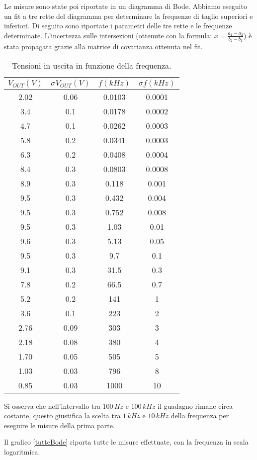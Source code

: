 \documentclass[10pt,a4paper]{article}
\begin{document}
Le misure sono state poi riportate in un diagramma di Bode. Abbiamo eseguito un fit a tre rette del diagramma per determinare la frequenze di taglio superiori e inferiori. Di seguito sono riportate i parametri delle tre rette e le frequenze determinate. L'incertezza sulle intersezioni (ottenute con la formula: $x = \frac{a_1-a_2}{b_2-b_1}$) è stata propagata grazie alla matrice di covarianza ottenuta nel fit. 

\begin{table}[!htb]\centering
\begin{tabular}{|c|c|c|c|}
\hline
$V_{OUT} (V)$ & $\sigma V_{OUT} (V)$ & $f(kHz)$ & $\sigma f (kHz)$\\
\hline
2.02 & 0.06 & 0.0103 & 0.0001\\
3.4 & 0.1 & 0.0178 & 0.0002\\
4.7 & 0.1 & 0.0262 & 0.0003\\
5.8 & 0.2 & 0.0341 & 0.0003\\
6.3 & 0.2 & 0.0408 & 0.0004\\
8.4 & 0.3 & 0.0803 & 0.0008\\
8.9 & 0.3 & 0.118 & 0.001\\
9.5 & 0.3 & 0.432 & 0.004\\
9.5 & 0.3 & 0.752 & 0.008\\
9.5 & 0.3 & 1.03 & 0.01\\
9.6 & 0.3 & 5.13 & 0.05\\
9.5 & 0.3 & 9.7 & 0.1\\
9.1 & 0.3 & 31.5 & 0.3\\
7.8 & 0.2 & 66.5 & 0.7\\
5.2 & 0.2 & 141 & 1\\
3.6 & 0.1 & 223 & 2\\
2.76 & 0.09 & 303 & 3\\
2.18 & 0.08 & 380 & 4\\
1.70 & 0.05 & 505 & 5\\
1.03 & 0.03 & 796 & 8\\
0.85 & 0.03 & 1000 & 10\\
\hline
\end{tabular}
\caption{Tensioni in uscita in funzione della frequenza.}
\label{bode}
\end{table}

Si osserva che nell'intervallo tra $100\,Hz$ e $100\,kHz$ il guadagno rimane circa costante, questo giustifica la scelta tra $1 \, kHz$ e $10 \, kHz$ della frequenza per eseguire le misure della prima parte.

Il grafico \ref{tutteBode} riporta tutte le misure effettuate, con la frequenza in scala logaritmica.
\end{document}

